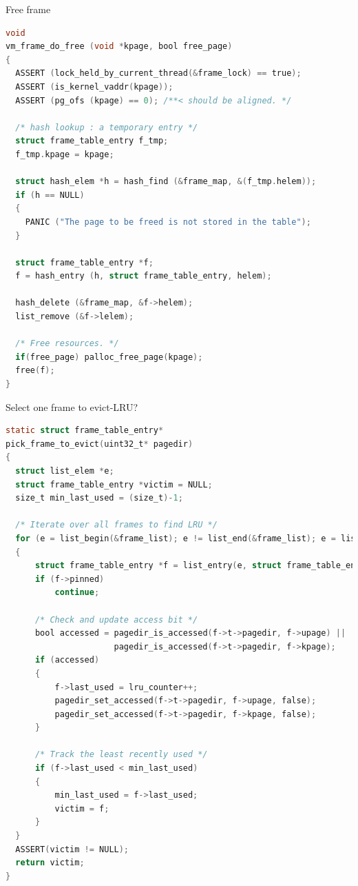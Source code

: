 \documentclass[10pt]{beamer}
\begin{document}
\begin{frame}[fragile]{Free frame}
\begin{lstlisting}[language=C]
void
vm_frame_do_free (void *kpage, bool free_page)
{
  ASSERT (lock_held_by_current_thread(&frame_lock) == true);
  ASSERT (is_kernel_vaddr(kpage));
  ASSERT (pg_ofs (kpage) == 0); /**< should be aligned. */

  /* hash lookup : a temporary entry */
  struct frame_table_entry f_tmp;
  f_tmp.kpage = kpage;

  struct hash_elem *h = hash_find (&frame_map, &(f_tmp.helem));
  if (h == NULL) 
  {
    PANIC ("The page to be freed is not stored in the table");
  }

  struct frame_table_entry *f;
  f = hash_entry (h, struct frame_table_entry, helem);

  hash_delete (&frame_map, &f->helem);
  list_remove (&f->lelem);

  /* Free resources. */
  if(free_page) palloc_free_page(kpage);
  free(f);
}
\end{lstlisting}
\end{frame}
\begin{frame}[fragile]{Select one frame to evict-LRU?}
\begin{lstlisting}[language=C]
static struct frame_table_entry*
pick_frame_to_evict(uint32_t* pagedir)
{
  struct list_elem *e;
  struct frame_table_entry *victim = NULL;
  size_t min_last_used = (size_t)-1;

  /* Iterate over all frames to find LRU */
  for (e = list_begin(&frame_list); e != list_end(&frame_list); e = list_next(e))
  {
      struct frame_table_entry *f = list_entry(e, struct frame_table_entry, lelem);
      if (f->pinned)
          continue;

      /* Check and update access bit */
      bool accessed = pagedir_is_accessed(f->t->pagedir, f->upage) ||
                      pagedir_is_accessed(f->t->pagedir, f->kpage);
      if (accessed)
      {
          f->last_used = lru_counter++;
          pagedir_set_accessed(f->t->pagedir, f->upage, false);
          pagedir_set_accessed(f->t->pagedir, f->kpage, false);
      }

      /* Track the least recently used */
      if (f->last_used < min_last_used)
      {
          min_last_used = f->last_used;
          victim = f;
      }
  }
  ASSERT(victim != NULL);
  return victim;
}
\end{lstlisting}
\end{frame}
\end{document}
